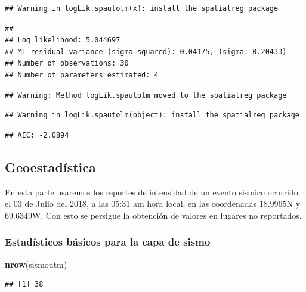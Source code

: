 \documentclass[11pt,]{article}
\newenvironment{Shaded}{\begin{snugshade}}{\end{snugshade}}
\newcommand{\KeywordTok}[1]{\textcolor[rgb]{0.13,0.29,0.53}{\textbf{#1}}}
\newcommand{\OperatorTok}[1]{\textcolor[rgb]{0.81,0.36,0.00}{\textbf{#1}}}
\newcommand{\NormalTok}[1]{#1}
\begin{document}
\begin{verbatim}
## Warning in logLik.spautolm(x): install the spatialreg package
\end{verbatim}

\begin{verbatim}
## 
## Log likelihood: 5.044697 
## ML residual variance (sigma squared): 0.04175, (sigma: 0.20433)
## Number of observations: 30 
## Number of parameters estimated: 4
\end{verbatim}

\begin{verbatim}
## Warning: Method logLik.spautolm moved to the spatialreg package
\end{verbatim}

\begin{verbatim}
## Warning in logLik.spautolm(object): install the spatialreg package
\end{verbatim}

\begin{verbatim}
## AIC: -2.0894
\end{verbatim}

\subsection{Geoestadística}\label{geoestaduxedstica-1}

En esta parte usaremos los reportes de intensidad de un evento sismico
ocurrido el 03 de Julio del 2018, a las 05:31 am hora local, en las
coordenadas 18.9965N y 69.6349W. Con esto se persigue la obtención de
valores en lugares no reportados.

\subsubsection{Estadísticos básicos para la capa de
sismo}\label{estaduxedsticos-buxe1sicos-para-la-capa-de-sismo}

\begin{Shaded}
\begin{Highlighting}[]
\KeywordTok{nrow}\NormalTok{(sismoutm)}
\end{Highlighting}
\end{Shaded}

\begin{verbatim}
## [1] 38
\end{verbatim}

\begin{Shaded}
\end{Shaded}
\end{document}
